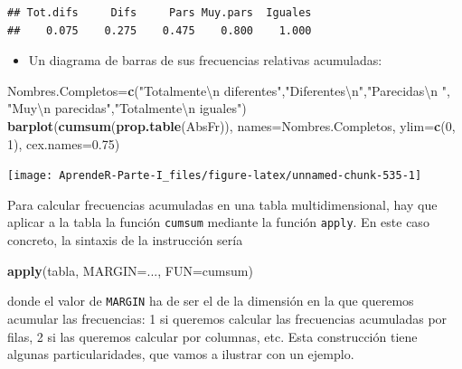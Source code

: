 \documentclass[]{book}
\newenvironment{Shaded}{\begin{snugshade}}{\end{snugshade}}
\newcommand{\CharTok}[1]{\textcolor[rgb]{0.31,0.60,0.02}{#1}}
\newcommand{\DataTypeTok}[1]{\textcolor[rgb]{0.13,0.29,0.53}{#1}}
\newcommand{\DecValTok}[1]{\textcolor[rgb]{0.00,0.00,0.81}{#1}}
\newcommand{\FloatTok}[1]{\textcolor[rgb]{0.00,0.00,0.81}{#1}}
\newcommand{\KeywordTok}[1]{\textcolor[rgb]{0.13,0.29,0.53}{\textbf{#1}}}
\newcommand{\NormalTok}[1]{#1}
\newcommand{\StringTok}[1]{\textcolor[rgb]{0.31,0.60,0.02}{#1}}
\providecommand{\tightlist}{%
  \setlength{\itemsep}{0pt}\setlength{\parskip}{0pt}}
\theoremstyle{definition}
\theoremstyle{definition}
\theoremstyle{definition}
\theoremstyle{remark}
\begin{document}
\begin{verbatim}
## Tot.difs     Difs     Pars Muy.pars  Iguales 
##    0.075    0.275    0.475    0.800    1.000
\end{verbatim}

\begin{itemize}
\tightlist
\item
  Un diagrama de barras de sus frecuencias relativas acumuladas:
\end{itemize}

\begin{Shaded}
\begin{Highlighting}[]
\NormalTok{Nombres.Completos=}\KeywordTok{c}\NormalTok{(}\StringTok{"Totalmente}\CharTok{\textbackslash{}n}\StringTok{ diferentes"}\NormalTok{,}\StringTok{"Diferentes}\CharTok{\textbackslash{}n}\StringTok{"}\NormalTok{,}\StringTok{"Parecidas}\CharTok{\textbackslash{}n}\StringTok{ "}\NormalTok{,}
                    \StringTok{"Muy}\CharTok{\textbackslash{}n}\StringTok{ parecidas"}\NormalTok{,}\StringTok{"Totalmente}\CharTok{\textbackslash{}n}\StringTok{ iguales"}\NormalTok{)}
\KeywordTok{barplot}\NormalTok{(}\KeywordTok{cumsum}\NormalTok{(}\KeywordTok{prop.table}\NormalTok{(AbsFr)), }\DataTypeTok{names=}\NormalTok{Nombres.Completos, }\DataTypeTok{ylim=}\KeywordTok{c}\NormalTok{(}\DecValTok{0}\NormalTok{, }\DecValTok{1}\NormalTok{), }\DataTypeTok{cex.names=}\FloatTok{0.75}\NormalTok{)}
\end{Highlighting}
\end{Shaded}

\begin{center}\texttt{[image: AprendeR-Parte-I\_files/figure-latex/unnamed-chunk-535-1]} \end{center}

Para calcular frecuencias acumuladas en una tabla multidimensional, hay que aplicar a la tabla la función \texttt{cumsum} mediante la función \texttt{apply}. En este caso concreto, la sintaxis de la instrucción sería

\begin{Shaded}
\begin{Highlighting}[]
\KeywordTok{apply}\NormalTok{(tabla, }\DataTypeTok{MARGIN=}\NormalTok{..., }\DataTypeTok{FUN=}\NormalTok{cumsum)}
\end{Highlighting}
\end{Shaded}

donde el valor de \texttt{MARGIN} ha de ser el de la dimensión en la que queremos acumular las frecuencias: 1 si queremos calcular las frecuencias acumuladas por filas, 2 si las queremos calcular por columnas, etc. Esta construcción tiene algunas particularidades, que vamos a ilustrar con un ejemplo.
\end{document}
